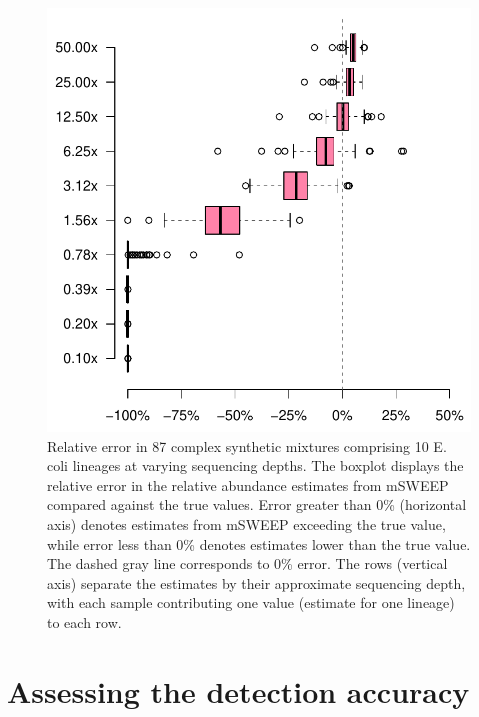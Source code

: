 \documentclass[officiallayout]{tktla}
\begin{document}
\begin{figure}[!ht]
  \centering
  \includegraphics[height=0.50\textheight,width=\textwidth,keepaspectratio]{img/reproduced/WOR2021_mSWEEP_Figure_5.pdf}
  \caption{Relative error in 87 complex synthetic mixtures comprising
    10 E. coli lineages at varying sequencing depths.  The boxplot
    displays the relative error in the relative abundance estimates
    from mSWEEP compared against the true values. Error greater than
    0\% (horizontal axis) denotes estimates from mSWEEP exceeding the
    true value, while error less than 0\% denotes estimates lower than
    the true value. The dashed gray line corresponds to 0\% error. The
    rows (vertical axis) separate the estimates by their approximate
    sequencing depth, with each sample contributing one value
    (estimate for one lineage) to each row.}
    \label{fig:msweep-sequencing-depth}
\end{figure}


\section{Assessing the detection accuracy}
\end{document}
